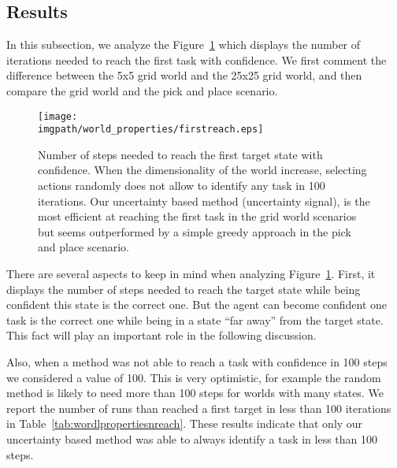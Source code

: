\subsection{Results}

In this subsection, we analyze the Figure~\ref{fig:wordlpropertiestimefirst} which displays the number of iterations needed to reach the first task with confidence. We first comment the difference between the 5x5 grid world and the 25x25 grid world, and then compare the grid world and the pick and place scenario.

\begin{figure}[!htbp]
\centering
\texttt{[image: \\imgpath/world\_properties/firstreach.eps]}
\caption{Number of steps needed to reach the first target state with confidence. When the dimensionality of the world increase, selecting actions randomly does not allow to identify any task in 100 iterations. Our uncertainty based method (uncertainty signal), is the most efficient at reaching the first task in the grid world scenarios but seems outperformed by a simple greedy approach in the pick and place scenario.}
\label{fig:wordlpropertiestimefirst}
\end{figure}

There are several aspects to keep in mind when analyzing Figure~\ref{fig:wordlpropertiestimefirst}. First, it displays the number of steps needed to reach the target state while being confident this state is the correct one. But the agent can become confident one task is the correct one while being in a state ``far away'' from the target state. 
This fact will play an important role in the following discussion.

Also, when a method was not able to reach a task with confidence in 100 steps we considered a value of 100. This is very optimistic, for example the random method is likely to need more than 100 steps for worlds with many states. We report the number of runs than reached a first target in less than 100 iterations in Table~\ref{tab:wordlpropertiesnreach}. These results indicate that only our uncertainty based method was able to always identify a task in less than 100 steps.

